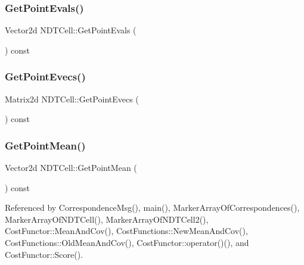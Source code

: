 \mbox{\label{classNDTCell_abdebdcf6e0cfd0715efdad6b6aebd5be}} 
\subsubsection{\texorpdfstring{Get\+Point\+Evals()}{GetPointEvals()}}
{\footnotesize\ttfamily Vector2d N\+D\+T\+Cell\+::\+Get\+Point\+Evals (\begin{DoxyParamCaption}{ }\end{DoxyParamCaption}) const\hspace{0.3cm}{\ttfamily [inline]}}

\mbox{\label{classNDTCell_aabd7f47d9683071303a431ebd640797a}} 
\subsubsection{\texorpdfstring{Get\+Point\+Evecs()}{GetPointEvecs()}}
{\footnotesize\ttfamily Matrix2d N\+D\+T\+Cell\+::\+Get\+Point\+Evecs (\begin{DoxyParamCaption}{ }\end{DoxyParamCaption}) const\hspace{0.3cm}{\ttfamily [inline]}}

\mbox{\label{classNDTCell_a61b2a9500daf0d912bfd904cbf169762}} 
\subsubsection{\texorpdfstring{Get\+Point\+Mean()}{GetPointMean()}}
{\footnotesize\ttfamily Vector2d N\+D\+T\+Cell\+::\+Get\+Point\+Mean (\begin{DoxyParamCaption}{ }\end{DoxyParamCaption}) const\hspace{0.3cm}{\ttfamily [inline]}}



Referenced by Correspondence\+Msg(), main(), Marker\+Array\+Of\+Correspondences(), Marker\+Array\+Of\+N\+D\+T\+Cell(), Marker\+Array\+Of\+N\+D\+T\+Cell2(), Cost\+Functor\+::\+Mean\+And\+Cov(), Cost\+Functions\+::\+New\+Mean\+And\+Cov(), Cost\+Functions\+::\+Old\+Mean\+And\+Cov(), Cost\+Functor\+::operator()(), and Cost\+Functor\+::\+Score().

